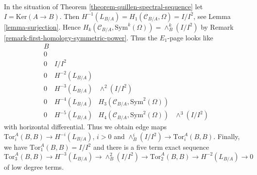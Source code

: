 \begin{remark}
\label{remark-elucidate-ss}
In the situation of Theorem \ref{theorem-quillen-spectral-sequence}
let $I = \text{Ker}(A \to B)$. Then
$H^{-1}(L_{B/A}) = H_1(\mathcal{C}_{B/A}, \Omega) = I/I^2$, see
Lemma \ref{lemma-surjection}.
Hence $H_k(\mathcal{C}_{B/A}, \text{Sym}^k(\Omega)) = \wedge^k_B(I/I^2)$ by
Remark \ref{remark-first-homology-symmetric-power}. Thus the
$E_1$-page looks like
$$
\begin{matrix}
B \\
0 \\
0 & I/I^2 \\
0 & H^{-2}(L_{B/A}) \\
0 & H^{-3}(L_{B/A}) & \wedge^2(I/I^2) \\
0 & H^{-4}(L_{B/A}) & H_3(\mathcal{C}_{B/A}, \text{Sym}^2(\Omega)) \\
0 & H^{-5}(L_{B/A}) & H_4(\mathcal{C}_{B/A}, \text{Sym}^2(\Omega)) &
\wedge^3(I/I^2)
\end{matrix}
$$
with horizontal differential. Thus we obtain edge maps
$\text{Tor}_i^A(B, B) \to H^{-i}(L_{B/A})$, $i > 0$ and
$\wedge^i_B(I/I^2) \to \text{Tor}_i^A(B, B)$. Finally, we have
$\text{Tor}_1^A(B, B) = I/I^2$ and there is a
five term exact sequence
$$
\text{Tor}_3^A(B, B) \to H^{-3}(L_{B/A}) \to \wedge^2_B(I/I^2) \to
\text{Tor}_2^A(B, B) \to H^{-2}(L_{B/A}) \to 0
$$
of low degree terms.
\end{remark}

